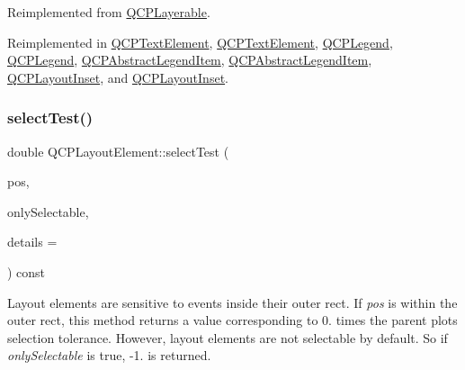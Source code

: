 Reimplemented from \hyperlink{class_q_c_p_layerable_a04db8351fefd44cfdb77958e75c6288e}{Q\+C\+P\+Layerable}.



Reimplemented in \hyperlink{class_q_c_p_text_element_a1e721bc2994a127ef5a8f0a514a5dbac}{Q\+C\+P\+Text\+Element}, \hyperlink{class_q_c_p_text_element_a29d2998b50ef369d88ca990b9d3542b3}{Q\+C\+P\+Text\+Element}, \hyperlink{class_q_c_p_legend_aa53507624491908fb3d1a514b1fc674e}{Q\+C\+P\+Legend}, \hyperlink{class_q_c_p_legend_a9dc868bd95069fad9f40718b7715e100}{Q\+C\+P\+Legend}, \hyperlink{class_q_c_p_abstract_legend_item_a80ec112a6608fc39dbed56239849b187}{Q\+C\+P\+Abstract\+Legend\+Item}, \hyperlink{class_q_c_p_abstract_legend_item_a8ca19faad8e2062e945772289a9151bd}{Q\+C\+P\+Abstract\+Legend\+Item}, \hyperlink{class_q_c_p_layout_inset_a2eeef7ea1b8340e7c7c2e2fc229df5ea}{Q\+C\+P\+Layout\+Inset}, and \hyperlink{class_q_c_p_layout_inset_a4bd96dd77545a2b407d24c8bdc276927}{Q\+C\+P\+Layout\+Inset}.

\mbox{\label{class_q_c_p_layout_element_ae97f483cccedadbf18ea4525ef240ee4}} 
\subsubsection{\texorpdfstring{select\+Test()}{selectTest()}\hspace{0.1cm}{\footnotesize\ttfamily [2/2]}}
{\footnotesize\ttfamily double Q\+C\+P\+Layout\+Element\+::select\+Test (\begin{DoxyParamCaption}\item[{const Q\+PointF \&}]{pos,  }\item[{bool}]{only\+Selectable,  }\item[{Q\+Variant $\ast$}]{details = {} }\end{DoxyParamCaption}) const\hspace{0.3cm}{\ttfamily [virtual]}}

Layout elements are sensitive to events inside their outer rect. If {\itshape pos} is within the outer rect, this method returns a value corresponding to 0. times the parent plot\textquotesingle{}s selection tolerance. However, layout elements are not selectable by default. So if {\itshape only\+Selectable} is true, -\/1. is returned.


